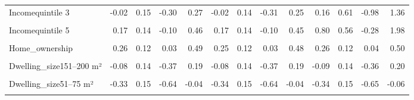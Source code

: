 \begin{table}
\begin{tabular}[t]{lrrrrrrrrrrrr}
Incomequintile 3 & -0.02 & 0.15 & -0.30 & 0.27 & -0.02 & 0.14 & -0.31 & 0.25 & 0.16 & 0.61 & -0.98 & 1.36\\
\cellcolor{gray!10}{Incomequintile 4} & \cellcolor{gray!10}{0.05} & \cellcolor{gray!10}{0.15} & \cellcolor{gray!10}{-0.24} & \cellcolor{gray!10}{0.34} & \cellcolor{gray!10}{0.05} & \cellcolor{gray!10}{0.14} & \cellcolor{gray!10}{-0.23} & \cellcolor{gray!10}{0.33} & \cellcolor{gray!10}{-0.04} & \cellcolor{gray!10}{0.63} & \cellcolor{gray!10}{-1.25} & \cellcolor{gray!10}{1.12}\\
Incomequintile 5 & 0.17 & 0.14 & -0.10 & 0.46 & 0.17 & 0.14 & -0.10 & 0.45 & 0.80 & 0.56 & -0.28 & 1.98\\
\cellcolor{gray!10}{Higher\_edu} & \cellcolor{gray!10}{0.14} & \cellcolor{gray!10}{0.09} & \cellcolor{gray!10}{-0.04} & \cellcolor{gray!10}{0.32} & \cellcolor{gray!10}{0.13} & \cellcolor{gray!10}{0.09} & \cellcolor{gray!10}{-0.04} & \cellcolor{gray!10}{0.32} & \cellcolor{gray!10}{0.13} & \cellcolor{gray!10}{0.09} & \cellcolor{gray!10}{-0.05} & \cellcolor{gray!10}{0.32}\\
Home\_ownership & 0.26 & 0.12 & 0.03 & 0.49 & 0.25 & 0.12 & 0.03 & 0.48 & 0.26 & 0.12 & 0.04 & 0.50\\
\cellcolor{gray!10}{Dwelling\_house} & \cellcolor{gray!10}{-0.13} & \cellcolor{gray!10}{0.11} & \cellcolor{gray!10}{-0.35} & \cellcolor{gray!10}{0.10} & \cellcolor{gray!10}{-0.13} & \cellcolor{gray!10}{0.12} & \cellcolor{gray!10}{-0.35} & \cellcolor{gray!10}{0.11} & \cellcolor{gray!10}{-0.12} & \cellcolor{gray!10}{0.12} & \cellcolor{gray!10}{-0.35} & \cellcolor{gray!10}{0.09}\\
Dwelling\_size151–200 m² & -0.08 & 0.14 & -0.37 & 0.19 & -0.08 & 0.14 & -0.37 & 0.19 & -0.09 & 0.14 & -0.36 & 0.20\\
\cellcolor{gray!10}{Dwelling\_size26–50 m²} & \cellcolor{gray!10}{-0.43} & \cellcolor{gray!10}{0.20} & \cellcolor{gray!10}{-0.84} & \cellcolor{gray!10}{-0.05} & \cellcolor{gray!10}{-0.43} & \cellcolor{gray!10}{0.21} & \cellcolor{gray!10}{-0.85} & \cellcolor{gray!10}{-0.05} & \cellcolor{gray!10}{-0.44} & \cellcolor{gray!10}{0.20} & \cellcolor{gray!10}{-0.86} & \cellcolor{gray!10}{-0.04}\\
Dwelling\_size51–75 m² & -0.33 & 0.15 & -0.64 & -0.04 & -0.34 & 0.15 & -0.64 & -0.04 & -0.34 & 0.15 & -0.65 & -0.06\\
\cellcolor{gray!10}{Dwelling\_size76–100 m²} & \cellcolor{gray!10}{-0.18} & \cellcolor{gray!10}{0.13} & \cellcolor{gray!10}{-0.44} & \cellcolor{gray!10}{0.07} & \cellcolor{gray!10}{-0.19} & \cellcolor{gray!10}{0.13} & \cellcolor{gray!10}{-0.44} & \cellcolor{gray!10}{0.07} & \cellcolor{gray!10}{-0.18} & \cellcolor{gray!10}{0.13} & \cellcolor{gray!10}{-0.42} & \cellcolor{gray!10}{0.07}\\

\end{tabular}
\end{table}
